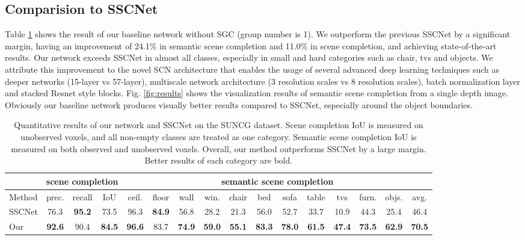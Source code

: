 \documentclass[runningheads]{llncs}
\begin{document}
\subsection{Comparision to SSCNet}
Table \ref{tab:baseline_results} shows the result of our baseline network without SGC (group number is 1). We outperform the previous SSCNet by a significant margin, having an improvement of 24.1\% in semantic scene completion and 11.0\% in scene completion, and achieving state-of-the-art results. Our network exceeds SSCNet in almost all classes, especially in small and hard categories such as chair, tvs and objects. We attribute this improvement to the novel SCN architecture that enables the usage of several advanced deep learning techniques such as deeper networks (15-layer vs 57-layer), multiscale network architecture (3 resolution scales vs 8 resolution scales), batch normalization layer \cite{ioffe2015batch} and stacked Resnet style blocks. Fig. \ref{fig:results} shows the visualization results of semantic scene completion from a single depth image. Obviously our baseline network produces visually better results compared to SSCNet, especially around the object boundaries.


\begin{table}[t]
\centering
\caption{Quantitative results of our network and SSCNet on the SUNCG dataset. Scene completion IoU is measured on unobserved voxels, and all non-empty classes are treated as one category. Semantic scene completion IoU is measured on both observed and unobserved voxels. Overall, our method outperforms SSCNet by a large margin. Better results of each category are bold.}
\label{tab:baseline_results}
\resizebox{\textwidth}{!}
{\begin{tabular}{l|ccc|cccccccccccc}
\hline
            & \multicolumn{3}{c|}{scene completion}  & \multicolumn{12}{c}{semantic scene completion}                                                                                                                                        \\ \hline
Method       & prec.         & recall & IoU           & ceil.         & floor & wall          & win.          & chair         & bed           & sofa          & table         & tvs           & furn.         & objs.         & avg.          \\ \hline
SSCNet \cite{song2016semantic}       & 76.3          & \textbf{95.2}   & 73.5          & 96.3          &\textbf{ 84.9}  & 56.8          & 28.2          & 21.3          & 56.0          & 52.7          & 33.7          & 10.9          & 44.3          & 25.4          & 46.4          \\ \hline
Our & \textbf{92.6} & 90.4   & \textbf{84.5} & \textbf{96.6} & 83.7  & \textbf{74.9} & \textbf{59.0} & \textbf{55.1} & \textbf{83.3} & \textbf{78.0} & \textbf{61.5} & \textbf{47.4} & \textbf{73.5} & \textbf{62.9} & \textbf{70.5} \\ \hline
\end{tabular}
}
\end{table}
\end{document}

